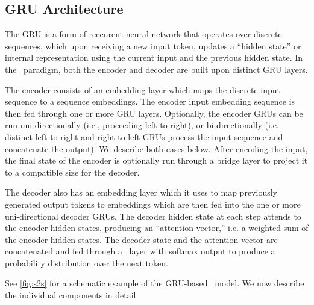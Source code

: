\subsection{GRU Architecture}
\label{sec:nlggru}



The GRU is a form of reccurent neural network \citep{elman1990} that operates over discrete 
sequences, which upon receiving a new input token, updates a ``hidden state'' 
or internal representation using the current
input and the previous hidden state. In the \sequencetosequence~paradigm,
both the encoder and decoder are built upon distinct GRU layers. 

The encoder consists of an embedding layer which maps the discrete input
sequence to a sequence embeddings. The encoder input embedding sequence 
is then fed through one or more GRU layers. Optionally, the encoder GRUs
can be run uni-directionally (i.e., proceeding left-to-right), or bi-directionally (i.e. distinct left-to-right and right-to-left 
GRUs process the input sequence and concatenate the output). We describe 
both cases below. After encoding the input, the final state of the encoder 
is optionally run through a bridge layer to project it to a compatible size
for the decoder. 

The decoder also has an embedding layer which it uses to map previously
generated output tokens to embeddings which are then fed into the 
one or more uni-directional decoder GRUs. The decoder hidden state at 
each step attends to the encoder hidden states, producing an ``attention vector,'' i.e. a weighted sum of the encoder hidden states. The decoder state
and the attention vector are concatenated and fed through a \feedforward~layer
with softmax output to produce a probability distribution over the next
token. 

See \autoref{fig:s2s} for a schematic example of the GRU-based
\sequencetosequence~model. We now describe the individual components in 
detail.


